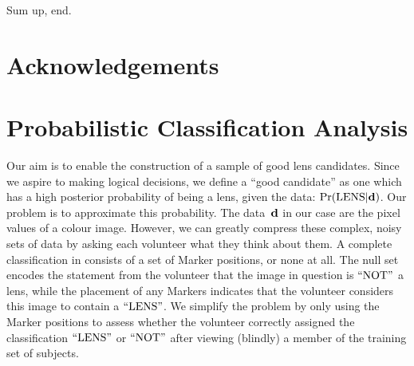 \documentclass[useAMS,usenatbib,a4paper]{mn2e}
\begin{document}
Sum up, end.


\section*{Acknowledgements}
 



\appendix


\section{Probabilistic Classification Analysis}
\label{appendix:swap}

Our aim is to enable the construction of a sample of good lens candidates.
Since we aspire to making logical  decisions, we define a  ``good candidate''
as one which has a high posterior probability of being a lens, given the data:
${\rm Pr}({\rm LENS}|{\mathbf{d}})$. Our problem is to approximate this probability. The data~${\mathbf{d}}$
in our case are the pixel values of a colour image. However, we can greatly
compress these complex, noisy sets of data by asking each volunteer what they
think about them. A complete  classification in \sw consists of a set of
Marker positions, or none at all. The null set encodes the statement from
the volunteer that the image in question is ${\rm ``NOT"}$ a lens, while the
placement of any  Markers indicates that the volunteer considers this image to
contain a ${\rm ``LENS"}$.  We simplify the problem by only using the Marker
positions to assess whether the volunteer  correctly assigned the
classification ${\rm ``LENS"}$ or ${\rm ``NOT"}$ after viewing (blindly) a member of
the training set of subjects. 
\end{document}
